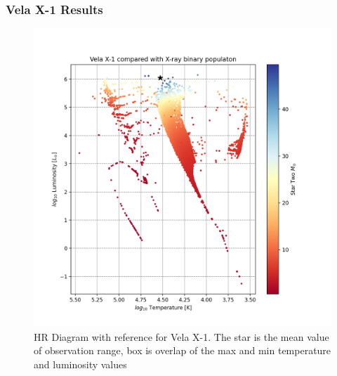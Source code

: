 \documentclass[12pt, a4paper]{article}
\begin{document}
            \subsubsection{Vela X-1 Results}
            \begin{figure}[H] 
                \centering
                \includegraphics[scale = .6]{figs/GeneratedFigs/VelaX-1/VelaX1XrBPopulationHRComp.png}
                \caption{HR Diagram with reference for Vela X-1. The star is the mean value of observation range, box is overlap of the max and min temperature and luminosity values}
                \label{VelaX1XrBPopulationHRComp}
            \end{figure}
\end{document}
